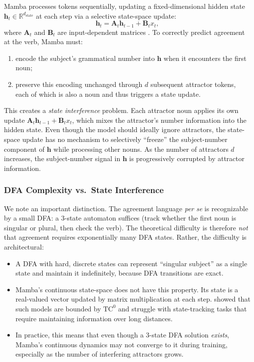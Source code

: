 \documentclass[11pt]{article}
\begin{document}
Mamba processes tokens sequentially, updating a fixed-dimensional hidden state $\mathbf{h}_t \in \mathbb{R}^{d_\mathrm{state}}$ at each step via a selective state-space update:
\[
\mathbf{h}_t = \mathbf{A}_t \mathbf{h}_{t-1} + \mathbf{B}_t x_t,
\]
where $\mathbf{A}_t$ and $\mathbf{B}_t$ are input-dependent matrices \citep{DBLP:journals/corr/abs-2312-00752}.
To correctly predict agreement at the verb, Mamba must:
\begin{enumerate}[itemsep=2pt,leftmargin=*]
    \item encode the subject's grammatical number into $\mathbf{h}$ when it encounters the first noun;
    \item preserve this encoding unchanged through $d$ subsequent attractor tokens, each of which is also a noun and thus triggers a state update.
\end{enumerate}
This creates a \emph{state interference} problem.
Each attractor noun applies its own update $\mathbf{A}_t \mathbf{h}_{t-1} + \mathbf{B}_t x_t$, which mixes the attractor's number information into the hidden state.
Even though the model should ideally ignore attractors, the state-space update has no mechanism to selectively ``freeze'' the subject-number component of $\mathbf{h}$ while processing other nouns.
As the number of attractors $d$ increases, the subject-number signal in $\mathbf{h}$ is progressively corrupted by attractor information.

\subsubsection{DFA Complexity vs.\ State Interference}

We note an important distinction.
The agreement language \emph{per se} is recognizable by a small DFA: a 3-state automaton suffices (track whether the first noun is singular or plural, then check the verb).
The theoretical difficulty is therefore \emph{not} that agreement requires exponentially many DFA states.
Rather, the difficulty is architectural:
\begin{itemize}[itemsep=2pt,leftmargin=*]
    \item A DFA with hard, discrete states can represent ``singular subject'' as a single state and maintain it indefinitely, because DFA transitions are exact.
    \item Mamba's continuous state-space does not have this property. Its state is a real-valued vector updated by matrix multiplication at each step. \citet{DBLP:conf/icml/MerrillPS24} showed that such models are bounded by $\mathrm{TC}^0$ and struggle with state-tracking tasks that require maintaining information over long distances.
    \item In practice, this means that even though a 3-state DFA solution \emph{exists}, Mamba's continuous dynamics may not converge to it during training, especially as the number of interfering attractors grows.
\end{itemize}
\end{document}

